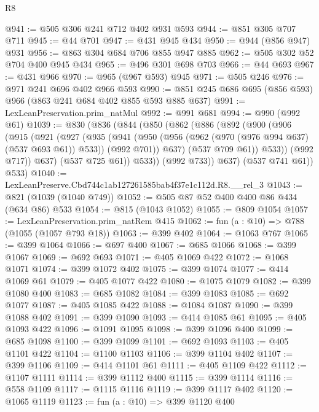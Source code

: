 \begin{lexlean}{R8}
\begin{coremodule}
@941 := @505 @306 @241 @712 @402 @931 @593
@944 := @851 @305 @707 @711
@945 := @44 @701
@947 := @431 @945 @434
@950 := @944 (@856 @947) @931
@956 := @863 @304 @684 @706 @855 @947 @885
@962 := @505 @302 @52 @704 @400 @945 @434
@965 := @496 @301 @698 @703
@966 := @44 @693
@967 := @431 @966
@970 := @965 (@967 @593) @945
@971 := @505 @246
@976 := @971 @241 @696 @402 @966 @593
@990 := @851 @245 @686 @695 (@856 @593) @966 (@863 @241 @684 @402 @855 @593 @885 @637)
@991 := LexLeanPreservation.prim_natMul
@992 := @991 @681
@994 := @990 (@992 @61)
@1039 := @830
    (@836
      (@844
        (@850
          (@862
            (@886
              (@892
                (@900
                  (@906
                    (@915
                      (@921
                        (@927
                          (@935
                            (@941
                              (@950
                                (@956 (@962 (@970 (@976 @994 @637) (@537 @693 @61)) @533))
                                (@992 @701))
                              @637)
                            (@537 @709 @61))
                          @533))
                      (@992 @717))
                    @637)
                  (@537 @725 @61))
                @533))
            (@992 @733))
          @637)
        (@537 @741 @61))
      @533)
@1040 := LexLeanPreserve.Cbd744c1ab127261585bab4f37e1c112d.R8.__rel_3
@1043 := @821 (@1039 (@1040 @749))
@1052 := @505 @87 @52 @400 @400 @86 @434 (@634 @86) @533
@1054 := @815 (@1043 @1052)
@1055 := @809 @1054
@1057 := LexLeanPreservation.prim_natRem @415
@1062 := fun (a : @10) => @788 (@1055 (@1057 @793 @18))
@1063 := @399 @402
@1064 := @1063 @767
@1065 := @399 @1064
@1066 := @697 @400
@1067 := @685 @1066
@1068 := @399 @1067
@1069 := @692 @693
@1071 := @405 @1069 @422
@1072 := @1068 @1071
@1074 := @399 @1072 @402
@1075 := @399 @1074
@1077 := @414 @1069 @61
@1079 := @405 @1077 @422
@1080 := @1075 @1079
@1082 := @399 @1080 @400
@1083 := @685 @1082
@1084 := @399 @1083
@1085 := @692 @1077
@1087 := @405 @1085 @422
@1088 := @1084 @1087
@1090 := @399 @1088 @402
@1091 := @399 @1090
@1093 := @414 @1085 @61
@1095 := @405 @1093 @422
@1096 := @1091 @1095
@1098 := @399 @1096 @400
@1099 := @685 @1098
@1100 := @399 @1099
@1101 := @692 @1093
@1103 := @405 @1101 @422
@1104 := @1100 @1103
@1106 := @399 @1104 @402
@1107 := @399 @1106
@1109 := @414 @1101 @61
@1111 := @405 @1109 @422
@1112 := @1107 @1111
@1114 := @399 @1112 @400
@1115 := @399 @1114
@1116 := @558 @1109
@1117 := @1115 @1116
@1119 := @399 @1117 @402
@1120 := @1065 @1119
@1123 := fun (a : @10) => @399 @1120 @400

\end{coremodule}
\end{lexlean}
